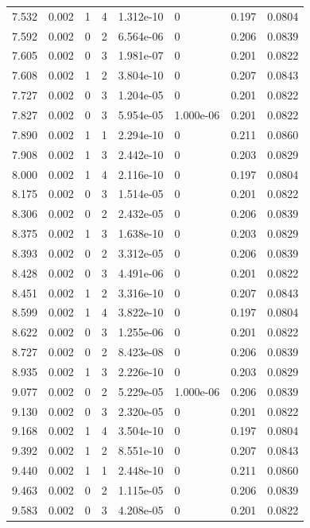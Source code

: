\documentclass[preview]{standalone}
\begin{document}
{{{\begin{tabular}{L{1.2cm}C{1.2cm} C{0.3cm}C{0.5cm} C{1.4cm}C{1.4cm} C{1.4cm}C{1.4cm}}
  7.532  &  0.002  & 1     &  4 &  1.312e-10  & 0  & 0.197 &  0.0804   \\ 
  7.592  &  0.002  & 0     &  2 &  6.564e-06  & 0  & 0.206 &  0.0839   \\ 
  7.605  &  0.002  & 0     &  3 &  1.981e-07  & 0  & 0.201 &  0.0822   \\ 
  7.608  &  0.002  & 1     &  2 &  3.804e-10  & 0  & 0.207 &  0.0843   \\ 
  7.727  &  0.002  & 0     &  3 &  1.204e-05  & 0  & 0.201 &  0.0822   \\ 
  7.827  &  0.002  & 0     &  3 &  5.954e-05  & 1.000e-06  & 0.201 &  0.0822   \\ 
  7.890  &  0.002  & 1     &  1 &  2.294e-10  & 0  & 0.211 &  0.0860   \\ 
  7.908  &  0.002  & 1     &  3 &  2.442e-10  & 0  & 0.203 &  0.0829   \\ 
  8.000  &  0.002  & 1     &  4 &  2.116e-10  & 0  & 0.197 &  0.0804   \\ 
  8.175  &  0.002  & 0     &  3 &  1.514e-05  & 0  & 0.201 &  0.0822   \\ 
  8.306  &  0.002  & 0     &  2 &  2.432e-05  & 0  & 0.206 &  0.0839   \\ 
  8.375  &  0.002  & 1     &  3 &  1.638e-10  & 0  & 0.203 &  0.0829   \\ 
  8.393  &  0.002  & 0     &  2 &  3.312e-05  & 0  & 0.206 &  0.0839   \\ 
  8.428  &  0.002  & 0     &  3 &  4.491e-06  & 0  & 0.201 &  0.0822   \\ 
  8.451  &  0.002  & 1     &  2 &  3.316e-10  & 0  & 0.207 &  0.0843   \\ 
  8.599  &  0.002  & 1     &  4 &  3.822e-10  & 0  & 0.197 &  0.0804   \\ 
  8.622  &  0.002  & 0     &  3 &  1.255e-06  & 0  & 0.201 &  0.0822   \\ 
  8.727  &  0.002  & 0     &  2 &  8.423e-08  & 0  & 0.206 &  0.0839   \\ 
  8.935  &  0.002  & 1     &  3 &  2.226e-10  & 0  & 0.203 &  0.0829   \\ 
  9.077  &  0.002  & 0     &  2 &  5.229e-05  & 1.000e-06  & 0.206 &  0.0839   \\ 
  9.130  &  0.002  & 0     &  3 &  2.320e-05  & 0  & 0.201 &  0.0822   \\ 
  9.168  &  0.002  & 1     &  4 &  3.504e-10  & 0  & 0.197 &  0.0804   \\ 
  9.392  &  0.002  & 1     &  2 &  8.551e-10  & 0  & 0.207 &  0.0843   \\ 
  9.440  &  0.002  & 1     &  1 &  2.448e-10  & 0  & 0.211 &  0.0860   \\ 
  9.463  &  0.002  & 0     &  2 &  1.115e-05  & 0  & 0.206 &  0.0839   \\ 
  9.583  &  0.002  & 0     &  3 &  4.208e-05  & 0  & 0.201 &  0.0822   \\ 
\hline 
\end{tabular} 

}}}
\end{document}
